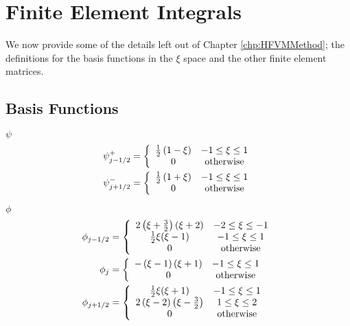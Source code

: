 \chapter{Finite Element Integrals}
\label{app:FEMIntegrals}
We now provide some of the details left out of Chapter \ref{chp:HFVMMethod}; the definitions for the basis functions in the $\xi$ space and the other finite element matrices. 

\section{Basis Functions}
$\psi$
\begin{align}
\psi^+_{j-1/2} &= \left\lbrace \begin{array}{c c}
\frac{1}{2}\left(1 - \xi\right) & -1 \le \xi \le 1\\
0 & \text{otherwise}
\end{array} \right. \\
\psi^-_{j+1/2} &= \left\lbrace \begin{array}{c c}
\frac{1}{2}\left(1 + \xi\right) & -1 \le \xi \le 1\\
0 & \text{otherwise}
\end{array} \right. 
\end{align}

$\phi$
\begin{align}
\phi_{j-1/2} &= \left\lbrace \begin{array}{c c}
2 \left(\xi + \frac{3}{2}\right)\left(\xi + 2\right) & -2 \le \xi \le -1\\
\frac{1}{2}\xi(\xi - 1) & -1 \le \xi \le 1\\
0 & \text{otherwise}\end{array} \right. \\
\phi_{j} &= \left\lbrace \begin{array}{c c}
-\left(\xi - 1\right)\left(\xi + 1\right) & -1 \le \xi \le 1\\
0 & \text{otherwise}
\end{array} \right. \\ 
\phi_{j+1/2} &= \left\lbrace \begin{array}{c c}
\frac{1}{2}\xi(\xi + 1) & -1 \le \xi \le 1\\
2\left(\xi - 2\right)\left(\xi - \frac{3}{2} \right) & 1 \le \xi \le 2\\
0 & \text{otherwise}
\end{array} \right. \\ 
\end{align}

